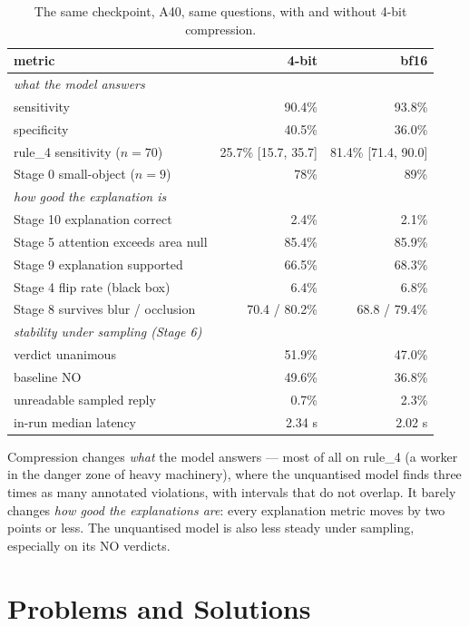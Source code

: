 \begin{table}[tbp]
\centering
\begin{tabular}{p{6.6cm}rr}
\toprule
\textbf{metric} & \textbf{4-bit} & \textbf{bf16} \\
\midrule
\multicolumn{3}{l}{\emph{what the model answers}} \\
sensitivity                       & 90.4\% & 93.8\% \\
specificity                       & 40.5\% & 36.0\% \\
rule\_4 sensitivity ($n=70$) & 25.7\% [15.7, 35.7] & 81.4\% [71.4, 90.0] \\
Stage 0 small-object ($n=9$)      & 78\%   & 89\%   \\
\midrule
\multicolumn{3}{l}{\emph{how good the explanation is}} \\
Stage 10 explanation correct      & 2.4\%  & 2.1\%  \\
Stage 5 attention exceeds area null & 85.4\% & 85.9\% \\
Stage 9 explanation supported     & 66.5\% & 68.3\% \\
Stage 4 flip rate (black box)     & 6.4\%  & 6.8\%  \\
Stage 8 survives blur / occlusion & 70.4 / 80.2\% & 68.8 / 79.4\% \\
\midrule
\multicolumn{3}{l}{\emph{stability under sampling (Stage 6)}} \\
verdict unanimous                 & 51.9\% & 47.0\% \\
\quad baseline NO                 & 49.6\% & 36.8\% \\
unreadable sampled reply          & 0.7\%  & 2.3\%  \\
\midrule
in-run median latency             & 2.34 s & 2.02 s \\
\bottomrule
\end{tabular}
\caption{The same checkpoint, A40, same questions, with and without 4-bit compression.}
\label{tab:s25}
\end{table}

Compression changes \emph{what} the model answers --- most of all on rule\_4 (a worker in the danger zone of heavy machinery), where the
unquantised model finds three times as many annotated violations, with intervals that do not overlap. It
barely changes \emph{how good the explanations are}: every explanation metric moves by two points or less.
The unquantised model is also less steady under sampling, especially on its NO verdicts.

\section{Problems and Solutions}

